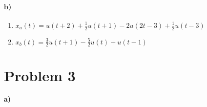 \documentclass[12pt]{article}
\begin{document}
\paragraph{b)}

\begin{enumerate}
    \item \(x_a(t)=u(t+2)+\frac{1}{2}u(t+1)-2u(2t-3)+\frac{1}{2}u(t-3)\)
    \item \(x_b(t)=\frac{3}{2}u(t+1)-\frac{5}{2}u(t)+u(t-1)\)
\end{enumerate}

\section*{Problem 3}

\paragraph{a)}
\end{document}
